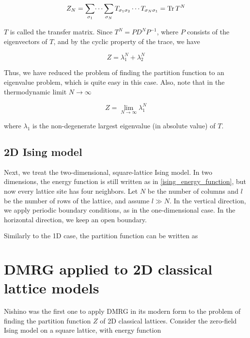 \begin{equation}
  Z_N = \sum_{\sigma_1} \dotsi \sum_{\sigma_N} T_{\sigma_1 \sigma_2} \dotsm T_{\sigma_N \sigma_1} = \operatorname{Tr} T^N
\end{equation}

$T$ is called the transfer matrix. Since $T^N = P D^N P^{-1}$, where $P$
consists of the eigenvectors of $T$, and by the cyclic property of the trace, we
have

\begin{equation}
  Z = \lambda_{1}^{N} + \lambda_{2}^{N}
\end{equation}

Thus, we have reduced the problem of finding the partition function to an
eigenvalue problem, which is quite easy in this case. Also, note that in the thermodynamic limit $N \to \infty$

\begin{equation}
  Z = \lim_{N \to \infty} \lambda_{1}^{N}
\end{equation}

where $\lambda_1$ is the non-degenerate largest eigenvalue (in absolute value) of $T$.

\subsection{2D Ising model}

Next, we treat the two-dimensional, square-lattice Ising model. In two
dimensions, the energy function is still written as in
\eqref{ising_energy_function}, but now every lattice site has four neighbors.
Let $N$ be the number of columns and $l$ be the number of rows of the lattice, and assume 
$l \gg N$. In the vertical direction, we apply periodic boundary conditions, as in the one-dimensional case.
In the horizontal direction, we keep an open boundary.

Similarly to the 1D case, the partition function can be written as 





\section{DMRG applied to 2D classical lattice models}






Nishino \cite{nishino1995density} was the first one to apply DMRG in its modern
form to the problem of finding the partition function $Z$ of 2D classical
lattices. Consider the zero-field Ising model on a square lattice, with energy function


